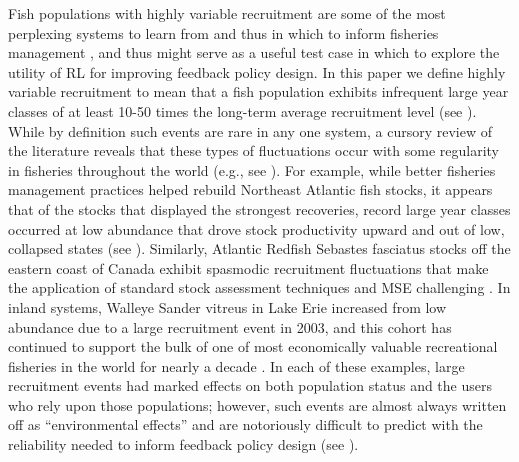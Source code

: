 \documentclass[floatfix,nofootinbib,longbibliography,notitlepage]{revtex4-1}
\def\eg{e.g.}
\begin{document}
Fish populations with highly variable recruitment are some of the most perplexing systems to learn from and thus in which to inform fisheries management \cite{hjort1914,caddy-gulland}, and thus might serve as a useful test case in which to explore the utility of RL for improving feedback policy design.  
In this paper we define highly variable recruitment to mean that a fish population exhibits infrequent large year classes of at least 10-50 times the long-term average recruitment level (see \cite{caddy-gulland}).  
While by definition such events are rare in any one system, a cursory review of the literature reveals that these types of fluctuations occur with some regularity in fisheries throughout the world (\eg, see \cite{fisch-etal-2019,licandeo-etal-2020}).  
For example, while better fisheries management practices helped rebuild Northeast Atlantic fish stocks, it appears that of the stocks that displayed the strongest recoveries, record large year classes occurred at low abundance that drove stock productivity upward and out of low, collapsed states (see \cite{zimmermann2019improved}).  
Similarly, Atlantic Redfish Sebastes fasciatus stocks off the eastern coast of Canada exhibit spasmodic recruitment fluctuations that make the application of standard stock assessment techniques and MSE challenging \cite{licandeo-etal-2020}.  
In inland systems, Walleye Sander vitreus in Lake Erie increased from low abundance due to a large recruitment event in 2003, and this cohort has continued to support the bulk of one of most economically valuable recreational fisheries in the world for nearly a decade \cite{schmitt-vandergoot}.  
In each of these examples, large recruitment events had marked effects on both population status and the users who rely upon those populations; however, such events are almost always written off as “environmental effects” and are notoriously difficult to predict with the reliability needed to inform feedback policy design (see \cite{punt2014, myers1998}).  
	
\end{document}
